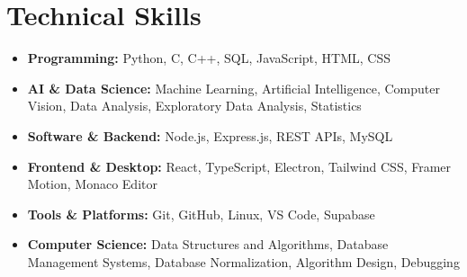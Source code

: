\documentclass[a4paper,10pt]{article}
\begin{document}
\section{Technical Skills}
 \begin{itemize}[leftmargin=0.15in, labelsep=0.08in, itemsep=1.5pt, parsep=0pt]
    \item \textbf{Programming:} Python, C, C++, SQL, JavaScript, HTML, CSS
    \item \textbf{AI \& Data Science:} Machine Learning, Artificial Intelligence, Computer Vision, Data Analysis, Exploratory Data Analysis, Statistics
    \item \textbf{Software \& Backend:} Node.js, Express.js, REST APIs, MySQL
    \item \textbf{Frontend \& Desktop:} React, TypeScript, Electron, Tailwind CSS, Framer Motion, Monaco Editor
    \item \textbf{Tools \& Platforms:} Git, GitHub, Linux, VS Code, Supabase
    \item \textbf{Computer Science:} Data Structures and Algorithms, Database Management Systems, Database Normalization, Algorithm Design, Debugging
 \end{itemize}

\end{document}
